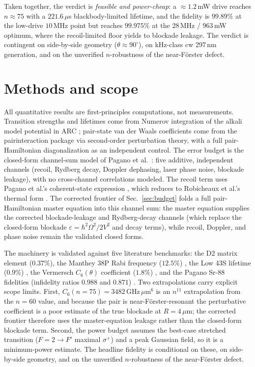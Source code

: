 \documentclass[twocolumn]{article}
\begin{document}
Taken together, the verdict is \emph{feasible and power-cheap}: a $\approx1.2$\,mW drive reaches $n\approx75$ with a $221.6\,\mu$s blackbody-limited lifetime, and the fidelity is $99.89\%$ at the low-drive $10$\,MHz point but reaches $99.975\%$ at the $28$\,MHz / $963$\,mW optimum, where the recoil-limited floor yields to blockade leakage. The verdict is contingent on side-by-side geometry ($\theta\approx90^\circ$), on kHz-class cw 297\,nm generation, and on the unverified $n$-robustness of the near-F\"orster defect.

\section*{Methods and scope}

All quantitative results are first-principles computations, not measurements. Transition strengths and lifetimes come from Numerov integration of the alkali model potential in ARC \cite{Sibalic2016}; pair-state van der Waals coefficients come from the pairinteraction package via second-order perturbation theory, with a full pair-Hamiltonian diagonalization as an independent control. The error budget is the closed-form channel-sum model of Pagano et al.\ \cite{Pagano2022}: five additive, independent channels (recoil, Rydberg decay, Doppler dephasing, laser phase noise, blockade leakage), with no cross-channel correlations modeled. The recoil term uses Pagano et al.'s coherent-state expression \cite{Pagano2022}, which reduces to Robicheaux et al.'s thermal form \cite{Robicheaux2021}. The corrected frontier of Sec.~\ref{sec:budget} folds a full pair-Hamiltonian master equation into this channel sum: the master equation supplies the corrected blockade-leakage and Rydberg-decay channels (which replace the closed-form blockade $\varepsilon=\hbar^2\Omega^2/2V^2$ and decay terms), while recoil, Doppler, and phase noise remain the validated closed forms.

The machinery is validated against five literature benchmarks: the D2 matrix element ($0.37\%$), the Manthey 38P Rabi frequency ($12.5\%$) \cite{Manthey2014}, the Low 43S lifetime ($0.9\%$) \cite{Low2012}, the Vermersch $C_6(\theta)$ coefficient ($1.8\%$) \cite{Vermersch2014}, and the Pagano Sr-88 fidelities (infidelity ratios $0.988$ and $0.871$) \cite{Pagano2022}. Two extrapolations carry explicit scope limits. First, $C_6(n{=}75)=3482\,\mathrm{GHz}\,\mu\mathrm{m}^6$ is an $n^{11}$ extrapolation from the $n=60$ value, and because the pair is near-F\"orster-resonant the perturbative coefficient is a poor estimate of the true blockade at $R=4\,\mu$m; the corrected frontier therefore uses the master-equation leakage rather than the closed-form blockade term. Second, the power budget assumes the best-case stretched transition ($F{=}2\rightarrow F'$ maximal $\sigma^+$) and a peak Gaussian field, so it is a minimum-power estimate. The headline fidelity is conditional on these, on side-by-side geometry, and on the unverified $n$-robustness of the near-F\"orster defect.
\end{document}
